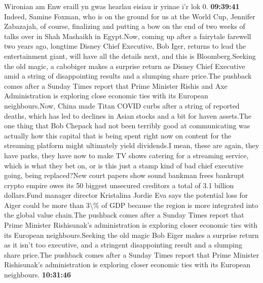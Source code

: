 \documentclass{article}%
\begin{document}
Wironian am Enw eraill yn gwas hearlau eisiau ir yrinae i'r lok 0.%
\textbf{09:39:41}%
\newline%
Indeed, Samine Foxman, who is on the ground for us at the World Cup, Jennifer Zabazajah, of course, finalizing and putting a bow on the end of two weeks of talks over in Shah Mashaikh in Egypt.Now, coming up after a fairytale farewell two years ago, longtime Disney Chief Executive, Bob Iger, returns to lead the entertainment giant, will have all the details next, and this is Bloomberg.Seeking the old magic, a cabobiger makes a surprise return as Disney Chief Executive amid a string of disappointing results and a slumping share price.The pushback comes after a Sunday Times report that Prime Minister Rishis and Axe Administration is exploring close economic ties with its European neighbours.Now, China made Titan COVID curbs after a string of reported deaths, which has led to declines in Asian stocks and a bit for haven assets.The one thing that Bob Chepack had not been terribly good at communicating was actually how this capital that is being spent right now on content for the streaming platform might ultimately yield dividends.I mean, these are again, they have parks, they have now to make TV shows catering for a streaming service, which is what they bet on, or is this just a stamp kind of bad chief executive going, being replaced?New court papers show sound bankman frees bankrupt crypto empire owes its 50 biggest unsecured creditors a total of 3.1 billion dollars.Fund manager director Kristalina Jordie Eva says the potential loss for Aiger could be more than 3\textbackslash{}\% of GDP because the region is more integrated into the global value chain.The pushback comes after a Sunday Times report that Prime Minister Rishisunak's administration is exploring closer economic ties with its European neighbours.Seeking the old magic Bob Eiger makes a surprise return as it isn't too executive, and a stringent disappointing result and a slumping share price.The pushback comes after a Sunday Times report that Prime Minister Rishisunak's administration is exploring closer economic ties with its European neighbours.%
\textbf{10:31:46}%
\newline%
\end{document}
